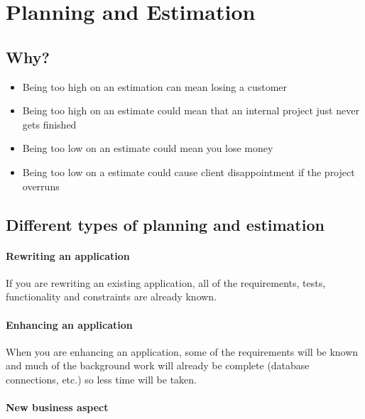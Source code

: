\section{Planning and Estimation}\label{sec:planning_and_estimation}

\subsection{Why?}\label{sub:why_}

\begin{itemize}
	\item Being too high on an estimation can mean losing a customer
	\item Being too high on an estimate could mean that an internal project just never gets finished
	\item Being too low on an estimate could mean you lose money
	\item Being too low on a estimate could cause client disappointment if the project overruns
\end{itemize}

\subsection{Different types of planning and estimation}\label{sub:different_types_of_planning_and_estimation}

\paragraph{Rewriting an application}\label{par:rewriting_an_application}

If you are rewriting an existing application, all of the requirements, tests, functionality and constraints are already known.

\paragraph{Enhancing an application}\label{par:enhancing_an_application}

When you are enhancing an application, some of the requirements will be known and much of the background work will already be complete (database connections, etc.) so less time will be taken.

\paragraph{New business aspect}\label{par:new_business_aspect}

